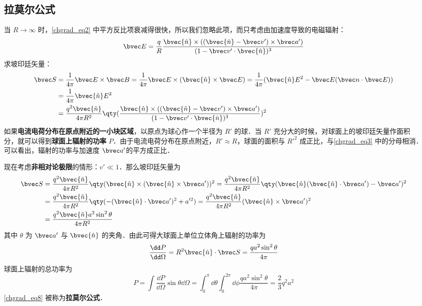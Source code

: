 \subsection{拉莫尔公式}
当 $R\rightarrow \infty$ 时，\autoref{chgrad_eq2} 中平方反比项衰减得很快，所以我们忽略此项，而只考虑由加速度导致的电磁辐射：
\begin{equation}
\bvec E=\frac{q}{R}\frac{\bvec{\hat n}\times ((\bvec{\hat n}-\bvec v')\times \bvec a')}{(1-\bvec v'\cdot \bvec{\hat n})^3}
\end{equation}
求坡印廷矢量：
\begin{equation}\label{chgrad_eq3}
\begin{aligned}
\bvec S&=\frac{1}{4\pi}\bvec E\times \bvec B=\frac{1}{4\pi}\bvec E\times (\bvec{\hat n}\times \bvec E)=\frac{1}{4\pi}(\bvec{\hat n}E^2-\bvec E(\bvec n\cdot \bvec E))\\
&=\frac{1}{4\pi}\bvec {\hat n}E^2\\
&=\frac{q^2\bvec{\hat n}}{4\pi R^2}\qty(\frac{\bvec{\hat n}\times ((\bvec{\hat n}-\bvec v')\times \bvec a')}{(1-\bvec v'\cdot \bvec{\hat n})^3})^2
\end{aligned}
\end{equation}
如果\textbf{电流电荷分布在原点附近的一小块区域}，以原点为球心作一个半径为 $R'$ 的球．当 $R'$ 充分大的时候，对球面上的坡印廷矢量作面积分，就可以得到\textbf{球面上辐射的功率} $P$．由于电流电荷分布在原点附近，$R'\approx R$，球面的面积与 $R'^2$ 成正比，与\autoref{chgrad_eq3} 中的分母相消．可以看出，辐射的功率与加速度 $\bvec a'$的平方成正比．

现在考虑\textbf{非相对论极限}的情形：$v'\ll 1$．那么坡印廷矢量为
\begin{equation}
\begin{aligned}
\bvec S&=\frac{q^2\bvec{\hat n}}{4\pi R^2}\qty(\bvec{\hat n}\times (\bvec{\hat n}\times \bvec a'))^2=\frac{q^2\bvec{\hat n}}{4\pi R^2}\qty(\bvec {\hat n}(\bvec{\hat n}\cdot \bvec a')-\bvec a')^2\\
&=\frac{q^2\bvec{\hat n}}{4\pi R^2}\qty( -(\bvec{\hat n}\cdot \bvec a')^2+a'^2 )=\frac{q^2\bvec{\hat n}}{4\pi R^2}(\bvec{\hat n}\times \bvec a')^2\\
&=\frac{q^2\bvec{\hat n}a^2\sin^2\theta}{4\pi R^2}
\end{aligned}
\end{equation}
其中 $\theta$ 为 $\bvec a'$ 与 $\bvec{\hat n}$ 的夹角．由此可得大球面上单位立体角上辐射的功率为
\begin{equation}
\frac{\dd P}{\dd \Omega}=R^2\bvec{\hat n}\cdot \bvec S=\frac{qa^2\sin^2\theta}{4\pi}
\end{equation}
球面上辐射的总功率为
\begin{equation}\label{chgrad_eq8}
P=\int \frac{\dd P}{\dd \Omega} \sin \theta\dd \Omega=\int_0^\pi\dd \theta\int_0^{2\pi} \dd \phi \frac{qa^2\sin^2\theta}{4\pi}=\frac{2}{3}q^2a^2
\end{equation}
\autoref{chgrad_eq8} 被称为\textbf{拉莫尔公式}．